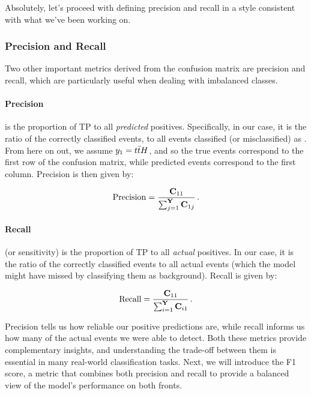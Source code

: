 Absolutely, let's proceed with defining precision and recall in a style consistent with what we've been working on.

\subsubsection{Precision and Recall}

Two other important metrics derived from the confusion matrix are precision and recall, which are particularly useful
when dealing with imbalanced classes.

\paragraph{Precision} is the proportion of TP to all \emph{predicted} positives. Specifically, in our case, it
is the ratio of the correctly classified \tth events, to all events classified (or misclassified) as \tth. From here on
out, we assume $y_1 = {t\bar{t}H}$, and so the true \tth events correspond to the first row of the confusion matrix, while
predicted \tth events correspond to the first column. Precision is then given by:

\begin{align}
    \text{Precision} = \frac{\mathbf{C}_{11}}{\sum_{j=1}^{\textbf{Y}} \mathbf{C}_{1j}}\,.
\end{align}

\paragraph{Recall} (or sensitivity) is the proportion of TP to all \emph{actual} positives. In our case, it is the ratio
of the correctly classified \tth events to all actual \tth events (which the model might have missed by classifying them
as background). Recall is given by:

\begin{align}
    \text{Recall} = \frac{\mathbf{C}_{11}}{\sum_{i=1}^{\textbf{Y}} \mathbf{C}_{i1}}\,.
\end{align}

Precision tells us how reliable our positive predictions are,
while recall informs us how many of the actual \tth events we were able to detect. Both these metrics provide
complementary insights, and understanding the trade-off between them is essential in many real-world classification
tasks. Next, we will introduce the F1 score, a metric that combines both precision and recall to provide a balanced view
of the model's performance on both fronts.

